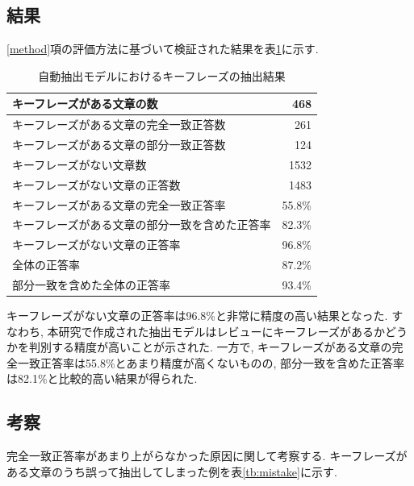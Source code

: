 \subsection{結果}
\ref{method}項の評価方法に基づいて検証された結果を表\ref{tb:qa}に示す. 

\begin{table}[H]
  \caption{自動抽出モデルにおけるキーフレーズの抽出結果}
  \small
  \label{tb:qa}
  \begin{center}
  \begin{tabularx}{\linewidth}{X|r}
    \hline
    キーフレーズがある文章の数&468\\\hline
    キーフレーズがある文章の完全一致正答数&261\\\hline
    キーフレーズがある文章の部分一致正答数&124\\\hline
    キーフレーズがない文章数&1532\\\hline
    キーフレーズがない文章の正答数&1483\\\hline\hline
    キーフレーズがある文章の完全一致正答率&55.8\%\\\hline
    キーフレーズがある文章の部分一致を含めた正答率&82.3\%\\\hline
    キーフレーズがない文章の正答率&96.8\%\\\hline\hline
    全体の正答率&87.2\%\\\hline
    部分一致を含めた全体の正答率&93.4\%\\\hline
  \end{tabularx}\end{center}
\end{table}

キーフレーズがない文章の正答率は96.8\%と非常に精度の高い結果となった. すなわち, 本研究で作成された抽出モデルはレビューにキーフレーズがあるかどうかを判別する精度が高いことが示された. 
一方で, キーフレーズがある文章の完全一致正答率は55.8\%とあまり精度が高くないものの, 部分一致を含めた正答率は82.1\%と比較的高い結果が得られた. 

\subsection{考察}
完全一致正答率があまり上がらなかった原因に関して考察する. 
キーフレーズがある文章のうち誤って抽出してしまった例を表\ref{tb:mistake}に示す.

